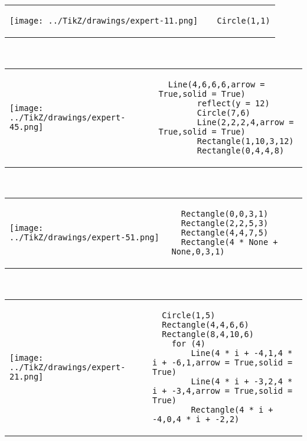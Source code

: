         \begin{tabular}{ll}
\texttt{[image: ../TikZ/drawings/expert-11.png]}&
        \begin{minipage}{10cm}
        \begin{verbatim}
  Circle(1,1)
        \end{verbatim}
\end{minipage}
\end{tabular}        
        \\

        \begin{tabular}{ll}
\texttt{[image: ../TikZ/drawings/expert-45.png]}&
        \begin{minipage}{10cm}
        \begin{verbatim}
  Line(4,6,6,6,arrow = True,solid = True)
        reflect(y = 12)
        Circle(7,6)
        Line(2,2,2,4,arrow = True,solid = True)
        Rectangle(1,10,3,12)
        Rectangle(0,4,4,8)
        \end{verbatim}
\end{minipage}
\end{tabular}        
        \\

        \begin{tabular}{ll}
\texttt{[image: ../TikZ/drawings/expert-51.png]}&
        \begin{minipage}{10cm}
        \begin{verbatim}
  Rectangle(0,0,3,1)
  Rectangle(2,2,5,3)
  Rectangle(4,4,7,5)
  Rectangle(4 * None + None,0,3,1)
        \end{verbatim}
\end{minipage}
\end{tabular}        
        \\

        \begin{tabular}{ll}
\texttt{[image: ../TikZ/drawings/expert-21.png]}&
        \begin{minipage}{10cm}
        \begin{verbatim}
  Circle(1,5)
  Rectangle(4,4,6,6)
  Rectangle(8,4,10,6)
    for (4)
        Line(4 * i + -4,1,4 * i + -6,1,arrow = True,solid = True)
        Line(4 * i + -3,2,4 * i + -3,4,arrow = True,solid = True)
        Rectangle(4 * i + -4,0,4 * i + -2,2)
        \end{verbatim}
\end{minipage}
\end{tabular}        
        \\

